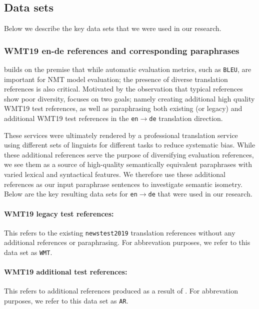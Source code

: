 \documentclass[11pt,a4paper]{article}
\begin{document}
\subsection{Data sets}

Below we describe the key data sets that we were used in our research.

\subsubsection{WMT19 en-de references and corresponding paraphrases}

\citet{freitag-bleu-paraphrase-references-2020} builds on the premise that while automatic evaluation metrics, such as \texttt{BLEU}, are important for NMT model evaluation; the presence of diverse translation references is also critical. Motivated by the observation that typical references show poor diversity, \citet{freitag-bleu-paraphrase-references-2020} focuses on two goals; namely creating additional high quality WMT19 test references, as well as paraphrasing both existing (or legacy) and additional WMT19 test references in the \texttt{en$\rightarrow$de} translation direction.

These services were ultimately rendered by a professional translation service using different sets of linguists for different tasks to reduce systematic bias. While these additional references serve the purpose of diversifying evaluation references, we see them as a source of high-quality semantically equivalent paraphrases with varied lexical and syntactical features. We therefore use these additional references as our input paraphrase sentences to investigate semantic isometry. Below are the key resulting data sets for \texttt{en$\rightarrow$de} that were used in our research.

\paragraph{WMT19 legacy test references:} This refers to the existing \texttt{newstest2019} translation references without any additional references or paraphrasing. For abbrevation purposes, we refer to this data set as \texttt{WMT}. 

\paragraph{WMT19 additional test references:} This refers to additional references produced as a result of \citet{freitag-bleu-paraphrase-references-2020}. For abbrevation purposes, we refer to this data set as \texttt{AR}. 
\end{document}
